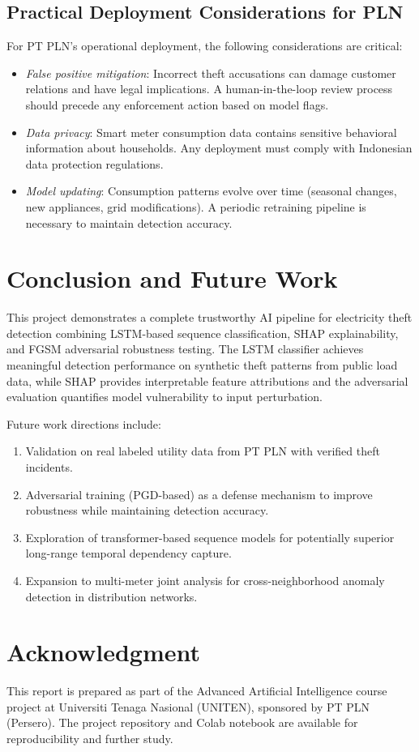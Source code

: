 \documentclass[journal]{IEEEtran}
\begin{document}
\subsection{Practical Deployment Considerations for PLN}
For PT PLN's operational deployment, the following considerations are critical:
\begin{itemize}
    \item \textit{False positive mitigation}: Incorrect theft accusations can damage customer relations and have legal implications. A human-in-the-loop review process should precede any enforcement action based on model flags.
    \item \textit{Data privacy}: Smart meter consumption data contains sensitive behavioral information about households. Any deployment must comply with Indonesian data protection regulations.
    \item \textit{Model updating}: Consumption patterns evolve over time (seasonal changes, new appliances, grid modifications). A periodic retraining pipeline is necessary to maintain detection accuracy.
\end{itemize}

\section{Conclusion and Future Work}
This project demonstrates a complete trustworthy AI pipeline for electricity theft detection combining LSTM-based sequence classification, SHAP explainability, and FGSM adversarial robustness testing. The LSTM classifier achieves meaningful detection performance on synthetic theft patterns from public load data, while SHAP provides interpretable feature attributions and the adversarial evaluation quantifies model vulnerability to input perturbation.

Future work directions include:
\begin{enumerate}
    \item Validation on real labeled utility data from PT PLN with verified theft incidents.
    \item Adversarial training (PGD-based) as a defense mechanism to improve robustness while maintaining detection accuracy.
    \item Exploration of transformer-based sequence models for potentially superior long-range temporal dependency capture.
    \item Expansion to multi-meter joint analysis for cross-neighborhood anomaly detection in distribution networks.
\end{enumerate}

\section*{Acknowledgment}
This report is prepared as part of the Advanced Artificial Intelligence course project at Universiti Tenaga Nasional (UNITEN), sponsored by PT PLN (Persero). The project repository and Colab notebook are available for reproducibility and further study.



\end{document}
